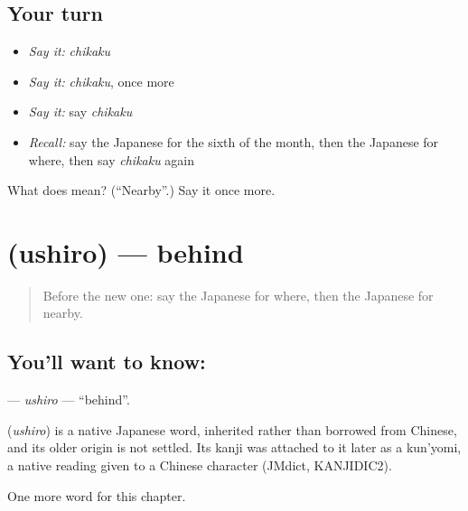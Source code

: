 \subsection*{Your turn}
\begin{itemize}
\raggedright
  \item \emph{Say it:} \emph{chikaku}
  \item \emph{Say it:} \emph{chikaku}, once more
  \item \emph{Say it:} say \emph{chikaku}
  \item \emph{Recall:} say the Japanese for the sixth of the month, then the Japanese for where, then say \emph{chikaku} again
\end{itemize}

\begin{tcolorbox}[breakable,colback=teal!4,colframe=teal!35!black,title={Before you move on}]
What does  mean? (\textquotedblleft{}Nearby\textquotedblright{}.) Say it once more.
\end{tcolorbox}
\section[\texorpdfstring{\ja{うしろ} (ushiro)}{うしろ (ushiro)}]{ (ushiro) — behind}

\label{lesson:JA-C78-ushiro}



\begin{quote}
Before the new one: say the Japanese for where, then the Japanese for nearby.
\end{quote}

\subsection*{You'll want to know: }
\textbf{} — \emph{ushiro} — \textquotedblleft{}behind\textquotedblright{}.

\begin{cousinweb}
\textbf{} (\emph{ushiro}) is a native Japanese word, inherited rather than borrowed from Chinese, and its older origin is not settled. Its kanji was attached to it later as a kun'yomi, a native reading given to a Chinese character (JMdict, KANJIDIC2).
\end{cousinweb}

\begin{grammarlens}[title={What you've built}]
One more word for this chapter.
\end{grammarlens}

